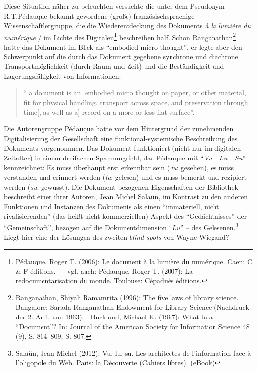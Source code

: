 Diese Situation näher zu beleuchten versuchte die unter dem Pseudonym
R.T.Pédauque bekannt gewordene (große) französischsprachige
Wissenschaftlergruppe, die die Wiederentdeckung des Dokuments \emph{à la
lumière du numérique} / im Lichte des Digitalen\footnote{Pédauque, Roger
  T. (2006): Le document à la lumière du numérique. Caen: C \& F
  éditions. --- vgl. auch: Pédauque, Roger T. (2007): La
  redocumentarisation du monde. Toulouse: Cépaduès éditions.}
beschreiben half. Schon Ranganathan\footnote{Ranganathan, Shiyali
  Ramamrita (1996): The five laws of library science. Bangalore: Sarada
  Ranganathan Endowment for Library Science (Nachdruck der 2. Aufl. von
  1963). - Buckland, Michael K. (1997): What Is a \enquote{Document}?
  In: Journal of the American Society for Information Science 48 (9), S.
  804--809; S. 807.} hatte das Dokument im Blick als \enquote{embodied
micro thought}, er legte aber den Schwerpunkt auf die durch das Dokument
gegebene synchrone und diachrone Transportmöglichkeit (durch Raum und
Zeit) und die Beständigkeit und Lagerungsfähigkeit von Informationen:

\begin{flushleft}
\begin{quote}
\enquote{{[}a document is an{]} embodied micro thought on paper, or
other material, fit for physical handling, transport across space, and
preservation through time{[}, as well as a{]} record on a more or less flat
surface}.
\end{quote}
\end{flushleft}

Die Autorengruppe Pédauque hatte vor dem Hintergrund der zunehmenden
Digitalisierung der Gesellschaft eine funktional-systemische
Beschreibung des Dokuments vorgenommen. Das Dokument funktioniert (nicht
nur im digitalen Zeitalter) in einem dreifachen Spannungsfeld, das
Pédauque mit \enquote{\emph{Vu - Lu - Su}} kennzeichnet: Es muss
überhaupt erst erkennbar sein (\emph{vu}: gesehen), es muss verstanden
und erinnert werden (\emph{lu}: gelesen) und es muss bemerkt und
rezipiert werden (\emph{su}: gewusst). Die Dokument bezogenen
Eigenschaften der Bibliothek beschreibt einer ihrer Autoren, Jean Michel
Salaün, im Kontrast zu den anderen Funktionen und Instanzen des
Dokuments als einen \enquote{immateriell, nicht rivalisierenden} (das
heißt nicht kommerziellen) Aspekt des \enquote{Gedächtnisses} der
\enquote{Gemeinschaft}, bezogen auf die Dokumentdimension
\enquote{\emph{Lu}} -- des Gelesenen.\footnote{Salaün, Jean-Michel
  (2012): Vu, lu, su. Les architectes de l'information face à
  l'oligopole du Web. Paris: la Découverte (Cahiers libres). (eBook)}
Liegt hier eine der Lösungen des zweiten \emph{blind spots} von Wayne
Wiegand?

